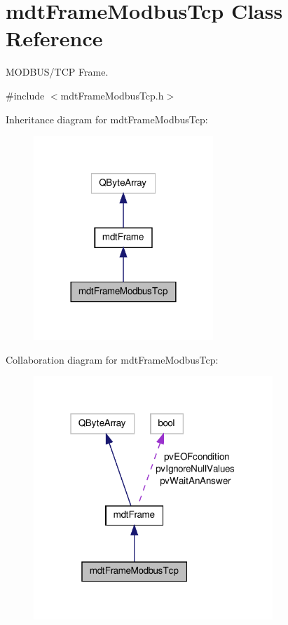 \hypertarget{classmdt_frame_modbus_tcp}{\section{mdt\-Frame\-Modbus\-Tcp Class Reference}
\label{classmdt_frame_modbus_tcp}
}


M\-O\-D\-B\-U\-S/\-T\-C\-P Frame.  




{\ttfamily \#include $<$mdt\-Frame\-Modbus\-Tcp.\-h$>$}



Inheritance diagram for mdt\-Frame\-Modbus\-Tcp\-:\nopagebreak
\begin{figure}[H]
\begin{center}
\leavevmode
\includegraphics[width=192pt]{classmdt_frame_modbus_tcp__inherit__graph}
\end{center}
\end{figure}


Collaboration diagram for mdt\-Frame\-Modbus\-Tcp\-:\nopagebreak
\begin{figure}[H]
\begin{center}
\leavevmode
\includegraphics[width=256pt]{classmdt_frame_modbus_tcp__coll__graph}
\end{center}
\end{figure}
